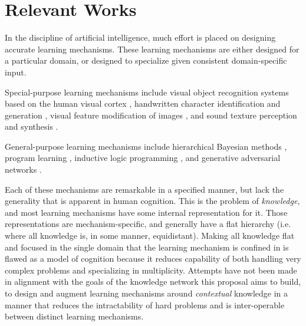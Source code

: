 \documentclass[11pt,letterpaper]{article}
\begin{document}
\section{Relevant Works}

In the discipline of artificial intelligence, much effort is placed on
designing accurate learning mechanisms. These learning mechanisms are
either designed for a particular domain, or designed to specialize
given consistent domain-specific input.

Special-purpose learning mechanisms include visual object recognition
systems based on the human visual cortex \cite{serre07}, handwritten
character identification and generation \cite{lake15}, visual feature
modification of images \cite{kulkarni15}, and sound texture perception and
synthesis \cite{mcdermott11}.

General-purpose learning mechanisms include hierarchical Bayesian methods
\cite{tenenbaum01}, program learning \cite{lake15}\cite{liang10}, inductive
logic programming \cite{lavrac94}, and generative adversarial networks
\cite{goodfellow14}.

Each of these mechanisms are remarkable in a specified manner, but lack the
generality that is apparent in human cognition. This is the problem of
\emph{knowledge}, and most learning mechanisms have some internal
representation for it. Those representations are mechanism-specific, and
generally have a flat hierarchy (i.e. where all knowledge is, in some
manner, equidistant). Making all knowledge flat and focused in the single
domain that the learning mechanism is confined in is flawed as a model of
cognition because it reduces capability of both handling very complex
problems and specializing in multiplicity. Attempts have not been made in
alignment with the goals of the knowledge network this proposal aims to
build, to design and augment learning mechanisms around \emph{contextual}
knowledge in a manner that reduces the intractability of hard problems and
is inter-operable between distinct learning mechanisms.
\end{document}

